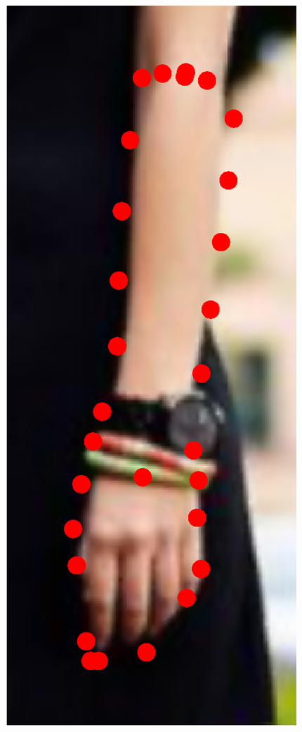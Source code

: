 \begin{figure}[!t]
    \includegraphics[height=\ofh]{resources/Annotation_Correction/Fittings/15.eps}
    \hfill

\end{figure}
